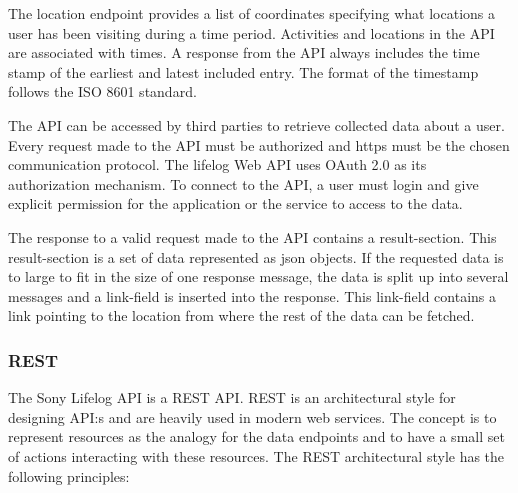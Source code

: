 \documentclass{cslthse-msc}
\begin{document}
The location endpoint provides a list of coordinates specifying what locations a user has been visiting during a time period. Activities and locations in the API are associated with times. A response from the API always includes the time stamp of the earliest and latest included entry. The format of the timestamp follows the ISO 8601 standard. 

The API can be accessed by third parties to retrieve collected data about a user. Every request made to the API must be authorized and https must be the chosen communication protocol. The lifelog Web API uses OAuth 2.0 as its authorization mechanism. To connect to the API, a user must login and give explicit permission for the application or the service to access to the data. 

The response to a valid request made to the API contains a result-section. This result-section is a set of data represented as json objects. If the requested data is to large to fit in the size of one response message, the data is split up into several messages and a link-field is inserted into the response. This link-field contains a link pointing to the location from where the rest of the data can be fetched. 

\subsubsection{REST}
\label{sec:rest}

The Sony Lifelog API is a REST API. REST is an architectural style for designing API:s and are heavily used in modern web services. The concept is to represent resources as the analogy for the data endpoints and to have a small set of actions interacting with these resources. The REST architectural style has the following principles\cite{pautasso2014restful}:
\end{document}
